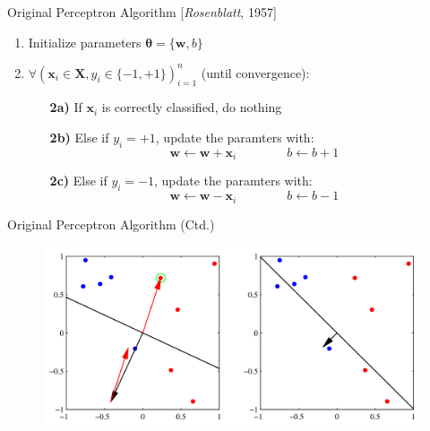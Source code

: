 \begin{frame}{Original Perceptron Algorithm [\textit{Rosenblatt}, 1957]}{}
	\begin{enumerate}
		\item Initialize parameters $\bm{\theta} = \{ \bm{w}, b \}$
		\item $\forall (\bm{x}_i \in \bm{X}, y_i \in \{ -1, +1 \})_{i=1}^n$ (until convergence):
		\begin{itemize}
			\item[\textbf{2a)}] If $\bm{x}_i$ is correctly classified, do nothing
			\item[\textbf{2b)}] Else if $y_i = +1$, update the paramters with:
			\begin{equation*}
				\bm{w} \longleftarrow \bm{w} + \bm{x}_i \qquad\qquad b \longleftarrow b + 1
			\end{equation*}
			\item[\textbf{2c)}] Else if $y_i = -1$, update the paramters with:
			\begin{equation*}
				\bm{w} \longleftarrow \bm{w} - \bm{x}_i \qquad\qquad b \longleftarrow b - 1
			\end{equation*}
		\end{itemize}
	\end{enumerate}
\end{frame}


\begin{frame}{Original Perceptron Algorithm (Ctd.)}{}
	\begin{figure}
		\centering
		\includegraphics[scale=0.35]{10_deep_learning/02_img/perceptron_1}
	\end{figure}
\end{frame}


